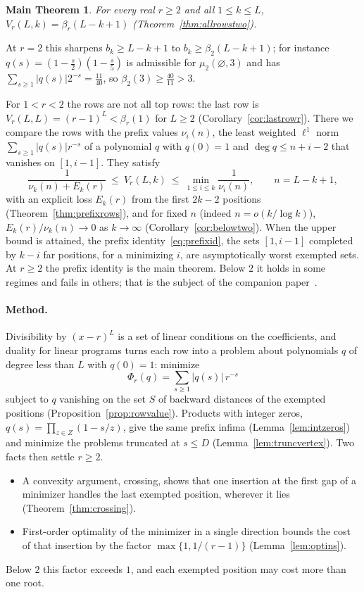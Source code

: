 \documentclass[11pt]{article}
\newtheorem*{mainthm}{Main Theorem}
\begin{document}
\begin{mainthm}
For every real $r\ge2$ and all $1\le k\le L$,
$V_r(L,k)=\beta_r(L-k+1)$ (Theorem~\ref{thm:allrowstwo}).
\end{mainthm}

At $r=2$ this sharpens $b_k\ge L-k+1$ to $b_k\ge\beta_2(L-k+1)$; for instance
$q(s)=(1-\frac s2)(1-\frac s5)$ is admissible for $\mu_2(\varnothing,3)$ and has
$\sum_{s\ge1}|q(s)|2^{-s}=\frac{11}{40}$, so
$\beta_2(3)\ge\frac{40}{11}>3$.

For $1<r<2$ the rows are not all top rows: the last row is
$V_r(L,L)=(r-1)^L<\beta_r(1)$ for $L\ge2$ (Corollary~\ref{cor:lastrowr}).
There we compare the rows with the prefix values $\nu_i(n)$, the least
weighted $\ell^1$ norm $\sum_{s\ge1}|q(s)|r^{-s}$ of a polynomial $q$ with
$q(0)=1$ and $\deg q\le n+i-2$ that vanishes on $[1,i-1]$.  They satisfy
\[
  \frac1{\nu_k(n)+E_k(r)}\ \le\ V_r(L,k)\ \le\ \min_{1\le i\le k}\frac1{\nu_i(n)},
  \qquad n=L-k+1,
\]
with an explicit loss $E_k(r)$ from the first $2k-2$ positions
(Theorem~\ref{thm:prefixrows}), and for fixed $n$ (indeed
$n=o(k/\log k)$), $E_k(r)/\nu_k(n)\to0$ as $k\to\infty$
(Corollary~\ref{cor:belowtwo}).  When the upper bound is attained, the
prefix identity~\eqref{eq:prefixid}, the sets $[1,i-1]$ completed by $k-i$
far positions, for a minimizing $i$, are asymptotically worst exempted
sets.  At $r\ge2$ the prefix identity is the main theorem.
Below $2$ it holds in some regimes and fails in others; that is the
subject of the companion paper~\cite{coefficient-mass-belowtwo}.

\paragraph{Method.}
Divisibility by $(x-r)^L$ is a set of linear conditions on the
coefficients, and duality for linear programs turns each row into a problem
about polynomials
$q$ of degree less than $L$ with $q(0)=1$: minimize
\[
  \Phi_r(q)=\sum_{s\ge1}|q(s)|\,r^{-s}
\]
subject to $q$ vanishing on the set $S$ of backward distances of the
exempted positions (Proposition~\ref{prop:rowvalue}).  Products with
integer zeros, $q(s)=\prod_{z\in Z}(1-s/z)$, give the same prefix infima
(Lemma~\ref{lem:intzeros}) and minimize the problems truncated at $s\le D$
(Lemma~\ref{lem:truncvertex}).  Two facts then settle $r\ge2$.
\begin{itemize}
\item A convexity argument, crossing, shows that one insertion at the
first gap of a minimizer handles the last exempted position, wherever it lies
(Theorem~\ref{thm:crossing}).
\item First-order optimality of the minimizer in a single direction bounds
the cost of that insertion by the factor $\max\{1,1/(r-1)\}$
(Lemma~\ref{lem:optins}).
\end{itemize}
Below $2$ this factor exceeds $1$, and each exempted position may cost
more than one root.
\end{document}
